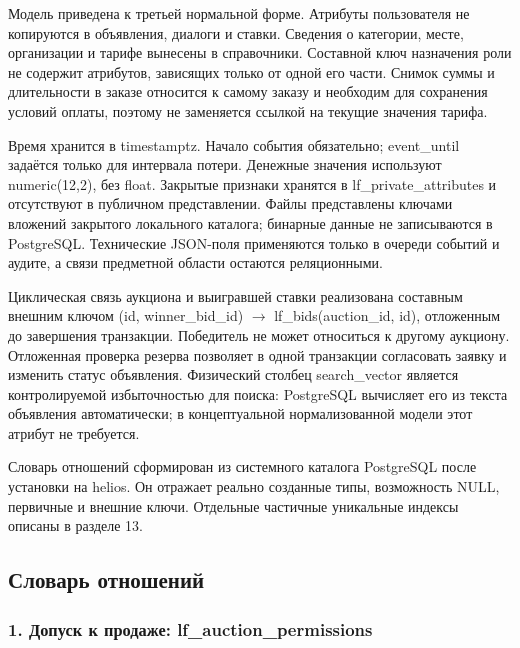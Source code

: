 Модель приведена к третьей нормальной форме. Атрибуты пользователя не копируются в объявления, диалоги и ставки. Сведения о категории, месте, организации и тарифе вынесены в справочники. Составной ключ назначения роли не содержит атрибутов, зависящих только от одной его части. Снимок суммы и длительности в заказе относится к самому заказу и необходим для сохранения условий оплаты, поэтому не заменяется ссылкой на текущие значения тарифа.

Время хранится в timestamptz. Начало события обязательно; event\_\allowbreak{}until задаётся только для интервала потери. Денежные значения используют numeric(12,2), без float. Закрытые признаки хранятся в lf\_\allowbreak{}private\_\allowbreak{}attributes и отсутствуют в публичном представлении. Файлы представлены ключами вложений закрытого локального каталога; бинарные данные не записываются в Postgre\allowbreak{}SQL. Технические JSON-поля применяются только в очереди событий и аудите, а связи предметной области остаются реляционными.

Циклическая связь аукциона и выигравшей ставки реализована составным внешним ключом (id, winner\_\allowbreak{}bid\_\allowbreak{}id) \ensuremath{\rightarrow} lf\_\allowbreak{}bids(auction\_\allowbreak{}id, id), отложенным до завершения транзакции. Победитель не может относиться к другому аукциону. Отложенная проверка резерва позволяет в одной транзакции согласовать заявку и изменить статус объявления. Физический столбец search\_\allowbreak{}vector является контролируемой избыточностью для поиска: Postgre\allowbreak{}SQL вычисляет его из текста объявления автоматически; в концептуальной нормализованной модели этот атрибут не требуется.

Словарь отношений сформирован из системного каталога Postgre\allowbreak{}SQL после установки на helios. Он отражает реально созданные типы, возможность NULL, первичные и внешние ключи. Отдельные частичные уникальные индексы описаны в разделе 13.

\FloatBarrier
{}
\subsection{Словарь отношений}

\FloatBarrier
{}
\subsubsection*{1. Допуск к продаже: lf\_\allowbreak{}auction\_\allowbreak{}permissions}

